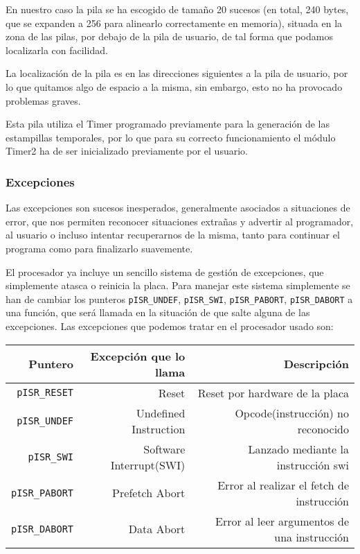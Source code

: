 \documentclass[12pt,letterpaper]{article}
\begin{document}
En nuestro caso la pila se ha escogido de tamaño 20 sucesos (en total,
240 bytes, que se expanden a 256 para alinearlo correctamente en
memoria), situada en la zona de las pilas, por debajo de la pila de
usuario, de tal forma que podamos localizarla con facilidad.

La localización de la pila es en las direcciones siguientes a la pila
de usuario, por lo que quitamos algo de espacio a la misma, sin
embargo, esto no ha provocado problemas graves.

Esta pila utiliza el Timer programado previamente para la generación
de las estampillas temporales, por lo que para su correcto
funcionamiento el módulo Timer2 ha de ser inicializado previamente por
el usuario.

\subsubsection{Excepciones}
\label{subsubsec:excepciones}
Las excepciones son sucesos inesperados, generalmente asociados a
situaciones de error, que nos permiten reconocer situaciones extrañas
y advertir al programador, al usuario o incluso intentar recuperarnos
de la misma, tanto para continuar el programa como para finalizarlo
suavemente.

El procesador ya incluye un sencillo sistema de gestión de
excepciones, que simplemente atasca o reinicia la placa. Para manejar
este sistema simplemente se han de cambiar los punteros
\texttt{pISR\_UNDEF}, \texttt{pISR\_SWI}, \texttt{pISR\_PABORT},
\texttt{pISR\_DABORT} a una función, que será llamada en la situación
de que salte alguna de las excepciones.  Las excepciones que podemos
tratar en el procesador usado son:
  \begin{center}
    \begin{tabular}{ r | r | r}
      Puntero                & Excepción que lo llama  & Descripción                                 \\
      \hline
      \texttt{pISR\_RESET}   & Reset                   & Reset por hardware de la placa              \\
      \texttt{pISR\_UNDEF}   & Undefined Instruction   & Opcode(instrucción) no reconocido           \\
      \texttt{pISR\_SWI}     & Software Interrupt(SWI) & Lanzado mediante la instrucción swi         \\
      \texttt{pISR\_PABORT}  & Prefetch Abort          & Error al realizar el fetch de instrucción   \\
      \texttt{pISR\_DABORT}  & Data Abort              & Error al leer argumentos de una instrucción \\
    \end{tabular}
  \end{center}
\end{document}
